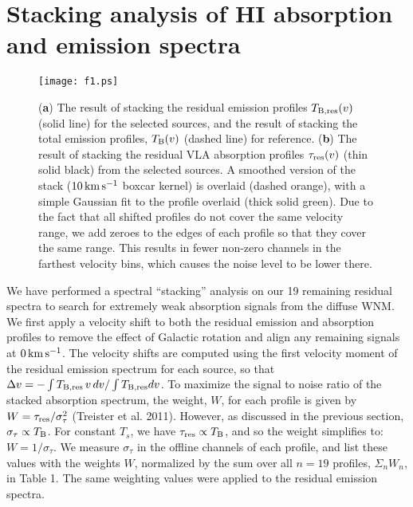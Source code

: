 \documentclass{aastex}
\begin{document}
\section{Stacking analysis of HI absorption and emission spectra}
\label{s:stacking}

\begin{figure*}
    \centering
    \texttt{[image: f1.ps]}
    \caption{ (\textbf{a}) The
    	result of stacking the residual emission profiles $T_{\rm B, res}(v)$ (solid line) for the \NoOfKeeps{} selected sources, and the result of stacking the total emission profiles, $T_{\rm B}(v)$ (dashed
	line) for reference. (\textbf{b}) The result of stacking the residual VLA
         absorption profiles $\tau_{\rm res}(v)$ (thin solid black) from the selected \NoOfKeeps{} sources. A smoothed version 
         of the stack ($10\rm\,km\,s^{-1}$ boxcar kernel) is overlaid 
         (dashed orange), with a simple Gaussian fit to the profile 
         overlaid (thick solid green). Due to the fact that all shifted 
         profiles do not cover the same velocity range, we add zeroes to 
         the edges of each profile so that they cover the same range. 
         This results in fewer non-zero channels in the farthest 
         velocity bins, which causes the noise level to be lower there. }
    \label{f:stack}
\end{figure*}

We have performed a spectral ``stacking'' analysis on 
our 19 remaining residual spectra to search for 
extremely weak absorption signals from the 
diffuse WNM. 
We first apply a velocity shift to both the residual emission and absorption profiles
to remove the effect of Galactic rotation and align any remaining 
signals at $0\,\rm km\,s^{-1}$.  The velocity shifts are computed 
using the first velocity moment of the residual emission spectrum for each source, so that 
$\Delta v=-\int T_{\rm B,res}\,v\,dv/\int T_{\rm B,res} dv$.
To maximize the signal to noise ratio of the stacked absorption spectrum, 
the weight, $W$, for each profile is given by
$W = \tau_{\rm res}/\sigma_{\tau}^2$
(Treister et al. 2011).
However, as discussed in the previous section,
$\sigma_{\tau} \propto T_{\rm B}$.  For constant $T_s$, we have
$\tau_{\rm res} \propto T_{\rm B}$, and so the weight simplifies to:
$W=1/\sigma_{\tau}$. We measure $\sigma_{\tau}$
in the offline channels of each profile, and list these values with
the weights $W$, normalized by the sum over all $n=19$ profiles,
$\Sigma_{n} W_{n}$, in Table 1. The same weighting 
values were applied to the residual emission spectra.
\end{document}
